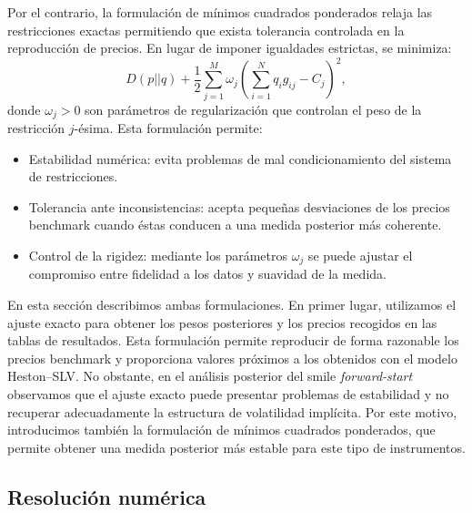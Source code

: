 Por el contrario, la formulación de mínimos cuadrados ponderados relaja las restricciones exactas permitiendo que exista tolerancia controlada en la reproducción de precios. En lugar de imponer igualdades estrictas, se minimiza:
\[
D(p||q) + \frac{1}{2}\sum_{j=1}^{M}\omega_j\left(\sum_{i=1}^{N} q_i g_{ij} - C_j\right)^2,
\]
donde \(\omega_j > 0\) son parámetros de regularización que controlan el peso de la restricción \(j\)-ésima. Esta formulación permite:
\begin{itemize}
  \item Estabilidad numérica: evita problemas de mal condicionamiento del sistema de restricciones.
  \item Tolerancia ante inconsistencias: acepta pequeñas desviaciones de los precios benchmark cuando éstas conducen a una medida posterior más coherente.
  \item Control de la rigidez: mediante los parámetros \(\omega_j\) se puede ajustar el compromiso entre fidelidad a los datos y suavidad de la medida.
\end{itemize}


En esta sección describimos ambas formulaciones. En primer lugar, utilizamos el ajuste exacto para obtener los pesos posteriores y los precios recogidos en las tablas de resultados. Esta formulación permite reproducir de forma razonable los precios benchmark y proporciona valores próximos a los obtenidos con el modelo Heston--SLV. No obstante, en el análisis posterior del smile \textit{forward-start} observamos que el ajuste exacto puede presentar problemas de estabilidad y no recuperar adecuadamente la estructura de volatilidad implícita. Por este motivo, introducimos también la formulación de mínimos cuadrados ponderados, que permite obtener una medida posterior más estable para este tipo de instrumentos.\medskip

\subsection{Resolución numérica}


